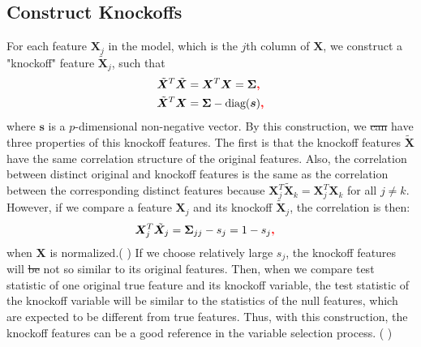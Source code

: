 \documentclass{uwstat572}
\newcommand{\vmdel}[1]{\sout{#1}}
\newcommand{\vmadd}[1]{\textbf{\color{red}{#1}}}
\newcommand{\vmcomment}[1]{({\color{blue}{VM's comment:}} \textbf{\color{blue}{#1}})}
\begin{document}
\subsection{Construct\vmadd{ing} Knockoffs}
For each feature $\bm{X}_j$ in the model, which is the $j$th column of $\bm{X}$, we construct a "knockoff" feature $\bm{\tilde X}_j$, such that 
\begin{align*}
& \tilde {\bm{X}}^T\tilde {\bm{X}} = \bm{X}^T\bm{X} = \bm{\Sigma}\vmadd{,} \\
& \tilde {\bm{X}}^T\bm{X} = \bm{\Sigma} - \text{diag}{(\bm{s})}\vmadd{,}
\end{align*}
where $\bm{s}$ is a $p$-dimensional non-negative vector. 
By this construction, we \vmdel{can} have three properties of this knockoff features. 
The first is that the knockoff features $\bm{\tilde{X}}$ have the same correlation structure of the original features. 
Also, the correlation between distinct original and knockoff features is the same as the correlation between the corresponding distinct features\vmadd{,} because $\bm{X}_j^T\tilde{\bm{X}}_k = \bm{X}_j^T\bm{X}_k$ for all $j\neq k$. 
However, if we compare a feature $\bm{X}_j$ and its knockoff $\bm{\tilde X}_j$, the correlation is then:
\begin{align*}
& \bm{X}_j^T\tilde{\bm{X}}_j = \bm{\Sigma}_{jj} - s_j = 1-s_j\vmadd{,}
\end{align*}
when $\bm{X}$ is normalized.\vmcomment{Define ``normalized".} 
If we choose relatively large $s_j$, the knockoff features will \vmdel{be} not \vmadd{be} so similar to its original features. 
Then, when we compare test statistic\vmadd{s?} of one original true feature and its knockoff variable, the test statistic of the knockoff variable will be similar to the statistics of the null features, which are expected to be different from true features. Thus, with this construction, the knockoff features can be a good reference in the variable selection process.
\vmcomment{What does it mean to be ``a good reference"?} 
\end{document}
